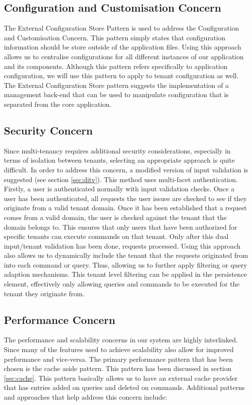 \subsection{Configuration and Customisation Concern}
The External Configuration Store Pattern is used to address the Configuration and Customisation Concern. This pattern simply states that configuration information should be store outside of the application files. Using this approach allows us to centralise configurations for all different instances of our application and its components. Although this pattern refers specifically to application configuration, we will use this pattern to apply to tenant configuration as well. The External Configuration Store pattern suggests the implementation of a management back-end that can be used to manipulate configuration that is separated from the core application.

\subsection{Security Concern}
Since multi-tenancy requires additional security considerations, especially in terms of isolation between tenants, selecting an appropriate approach is quite difficult. In order to address this concern, a modified version of input validation is suggested (see section \ref{sec:ditv}). This method uses multi-facet authentication. Firstly, a user is authenticated normally with input validation checks. Once a user has been authenticated, all requests the user issues are checked to see if they originate from a valid tenant domain. Once it has been established that a request comes from a valid domain, the user is checked against the tenant that the domain belongs to. This ensures that only users that have been authorized for specific tenants can execute commands on that tenant. Only after this dual input/tenant validation has been done, requests processed. Using this approach also allows us to dynamically include the tenant that the requests originated from into each command or query. Thus, allowing us to further apply filtering or query adaption mechanisms. This tenant level filtering can be applied in the persistence element, effectively only allowing queries and commands to be executed for the tenant they originate from. 


\subsection{Performance Concern}
The performance and scalability concerns in our system are highly interlinked. Since many of the features used to achieve scalability also allow for improved performance and vice-versa. The primary performance pattern that has been chosen is the cache aside pattern. This pattern has been discussed in section \ref{sec:cache}. This pattern basically allows us to have an external cache provider that has entries added on queries and deleted on commands. Additional patterns and approaches that help address this concern include:

